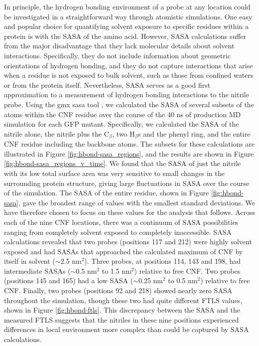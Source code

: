 In principle, the hydrogen bonding environment of a probe at any location could be investigated in a straightforward way through atomistic simulations.
One easy and popular choice for quantifying solvent exposure to specific residues within a protein is with the SASA of the amino acid.
However, SASA calculations suffer from the major disadvantage that they lack molecular details about solvent interactions.
Specifically, they do not include information about geometric orientations of hydrogen bonding, and they do not capture interactions that arise when a residue is not exposed to bulk solvent, such as those from confined waters or from the protein itself.
Nevertheless, SASA serves as a good first approximation to a measurement of hydrogen bonding interactions to the nitrile probe.  
Using the gmx sasa tool \cite{Eisenhaber1995}, we calculated the SASA of several subsets of the atoms within the CNF residue over the course of the 40 ns of production MD simulation for each GFP mutant. 
Specifically, we calculated the SASA of the nitrile alone, the nitrile plus the C$_{\beta}$, two H$_{\beta}$s and the phenyl ring, and the entire CNF residue including the backbone atoms.
The subsets for these calculations are illustrated in Figure \ref{fig:hbond-sasa_regions}, and the results are shown in Figure \ref{fig:hbond-sasa_regions_v_time}.
We found that the SASA of just the nitrile with its low total surface area was very sensitive to small changes in the surrounding protein structure, giving large fluctuations in SASA over the course of the simulation.
The SASA of the entire residue, shown in Figure \ref{fig:hbond-sasa}, gave the broadest range of values with the smallest standard deviations.
We have therefore chosen to focus on these values for the analysis that follows.
Across each of the nine CNF locations, there was a continuum of SASA possibilities ranging from completely solvent exposed to completely inaccessible.
SASA calculations revealed that two probes (positions 117 and 212) were highly solvent exposed and had SASAs that approached the calculated maximum of CNF by itself in solvent ($\sim$2.5 nm$^2$).
Three probes, at positions 114, 143 and 198, had intermediate SASAs ($\sim$0.5 nm$^2$ to 1.5 nm$^2$) relative to free CNF.
Two probes (positions 145 and 165) had a low SASA ($\sim$0.25 nm$^2$ to 0.5 nm$^2$) relative to free CNF.
Finally, two probes (positions 92 and 218) showed nearly zero SASA throughout the simulation, though these two had quite different FTLS values, shown in Figure \ref{fig:hbond-ftls}.
This discrepancy between the SASA and the measured FTLS suggests that the nitriles in these nine positions experienced differences in local environment more complex than could be captured by SASA calculations.

